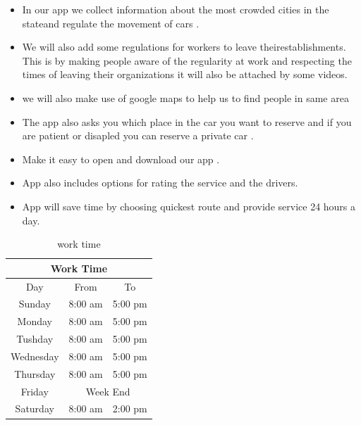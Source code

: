 \documentclass{article}
\begin{document}
\begin{itemize}
\item In our app we collect information about the most crowded cities in the 
stateand regulate the movement of cars . 
\item  We will also add some regulations for workers to leave 
theirestablishments. This is by making people aware of the regularity at 
work and respecting the times of leaving their organizations it will also be 
attached by some videos.
\item we will also make use of google maps to help us to find people in same area 
\item The app also asks you which place in the car you want to reserve and if you 
are patient or disapled you can reserve a private car . 
\item Make it easy to open and download our app .
\item App also includes options for rating the service and the drivers. 
\item App will save time by choosing quickest route and provide service 24 hours a 
day.
\end{itemize}

\begin{table}
\centering
\begin{tabular}{|c|c|c|}
\hline 
\multicolumn{3}{|c|}{Work Time}\\
\hline
Day & From & To \\ 

\hline 
Sunday &8:00 am  & 5:00 pm \\ 
\hline 
Monday & 8:00 am & 5:00 pm  \\ 
\hline 
Tushday & 8:00 am &5:00 pm  \\ 
\hline 
Wednesday& 8:00 am &5:00 pm  \\ 
\hline 
Thursday & 8:00 am &5:00 pm  \\ 
\hline 
Friday&\multicolumn{2}{|c|}{Week End}\\
\hline 
Saturday & 8:00 am & 2:00 pm \\
\hline
\end{tabular} 
\caption{work time}\label{t1}
\end{table}
\newpage
\end{document}
